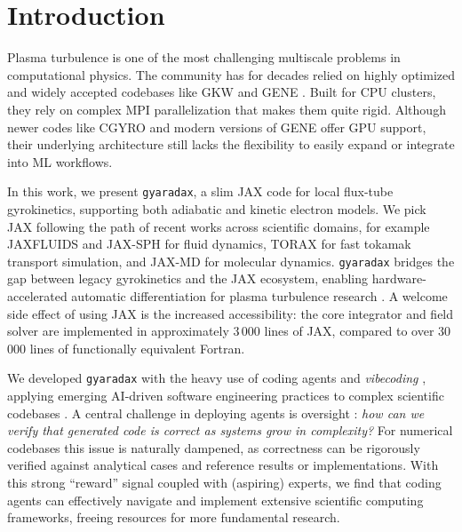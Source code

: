 \documentclass{article}
\theoremstyle{plain}
\theoremstyle{definition}
\theoremstyle{remark}
\begin{document}
\section{Introduction}

Plasma turbulence is one of the most challenging multiscale problems in computational physics. The community has for decades relied on highly optimized and widely accepted codebases like GKW \cite{PEETERS_GKW_2009} and GENE \cite{jenko2000electron}. Built for CPU clusters, they rely on complex MPI parallelization that makes them quite rigid. Although newer codes like CGYRO \cite{CANDY201673} and modern versions of GENE offer GPU support, their underlying architecture still lacks the flexibility to easily expand or integrate into ML workflows.

%
In this work, we present \texttt{gyaradax}, a slim JAX code for local flux-tube gyrokinetics, supporting both adiabatic and kinetic electron models.
We pick JAX \cite{jax2018github} following the path of recent works across scientific domains, for example JAXFLUIDS \cite{Bezgin2023} and JAX-SPH \cite{toshev2024jax} for fluid dynamics, TORAX \cite{citrin2024toraxfastdifferentiabletokamak} for fast tokamak transport simulation, and JAX-MD \cite{jaxmd2020} for molecular dynamics.
\texttt{gyaradax} bridges the gap between legacy gyrokinetics and the JAX ecosystem, enabling hardware-accelerated automatic differentiation for plasma turbulence research \cite{paischer2025gyroswin,kelling2025artificialscientistintransit,Zanisi2024}.
A welcome side effect of using JAX is the increased accessibility: the core integrator and field solver are implemented in approximately 3\,000 lines of JAX, compared to over 30\,000 lines of functionally equivalent Fortran.

We developed \texttt{gyaradax} with the heavy use of coding agents \cite{yang2024sweagentagentcomputerinterfacesenable} and \textit{vibecoding} \cite{karpathy2025vibecoding},
applying emerging AI-driven software engineering practices to complex scientific codebases \cite{chen2025scienceagentbenchrigorousassessmentlanguage,duston2025ainsteinbenchbenchmarkingcodingagents}.
A central challenge in deploying agents is oversight \cite{bowman2022measuringprogressscalableoversight}: \textit{how can we verify that generated code is correct as systems grow in complexity?}
%
For numerical codebases this issue is naturally dampened, as correctness can be rigorously verified against analytical cases and reference results or implementations.
With this strong ``reward'' signal coupled with (aspiring) experts, we find that coding agents can effectively navigate and implement extensive scientific computing frameworks, freeing resources for more fundamental research.
\end{document}
